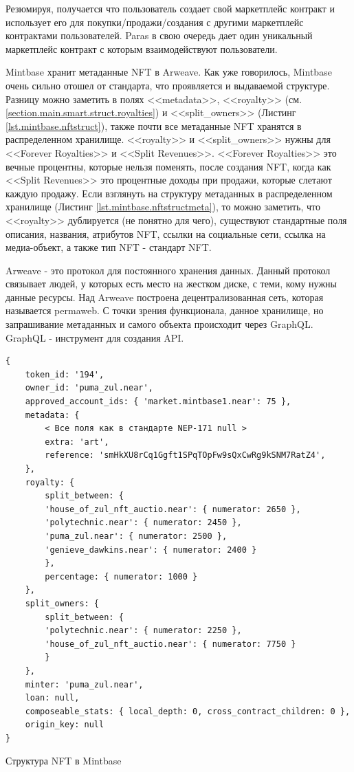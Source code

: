 Резюмируя, получается что пользователь создает свой маркетплейс контракт и использует его для покупки/продажи/создания с другими маркетплейс контрактами пользователей. Paras в свою очередь дает один уникальный маркетплейс контракт с которым взаимодействуют пользователи.

Mintbase хранит метаданные NFT в Arweave. Как уже говорилось, Mintbase очень сильно отошел от стандарта, что проявляется и выдаваемой структуре. Разницу можно заметить в полях <<metadata>>, <<royalty>> (см. {\color{blue} \ref{section.main.smart.struct.royalties}}) и <<split\_owners>> (Листинг {\color{blue} \ref{lst.mintbase.nftstruct}}), также почти все метаданные NFT хранятся в распределенном хранилище. <<royalty>> и <<split\_owners>> нужны для <<Forever Royalties>> и <<Split Revenues>>. <<Forever Royalties>> это вечные процентны, которые нельзя поменять, после создания NFT, когда как <<Split Revenues>> это процентные доходы при продажи, которые слетают каждую продажу. Если взглянуть на структуру метаданных в распределенном хранилище (Листинг {\color{blue} \ref{lst.mintbase.nftstructmeta}}), то можно заметить, что <<royalty>> дублируется (не понятно для чего), существуют стандартные поля описания, названия, атрибутов NFT, ссылки на социальные сети, ссылка на медиа-объект, а также тип NFT - стандарт NFT.

\begin{definition}
    Arweave\cite{arweave} - это протокол для постоянного хранения данных. Данный протокол связывает людей, у которых есть место на жестком диске, с теми, кому нужны данные ресурсы. Над Arweave построена децентрализованная сеть, которая называется permaweb\cite{permaweb}. С точки зрения функционала, данное хранилище, но запрашивание метаданных и самого объекта происходит через GraphQL\cite{graphql}. GraphQL - инструмент для создания API.
\end{definition}

\begin{listing}
\begin{verbatim}
{
    token_id: '194',
    owner_id: 'puma_zul.near',
    approved_account_ids: { 'market.mintbase1.near': 75 },
    metadata: {
        < Все поля как в стандарте NEP-171 null >
        extra: 'art',
        reference: 'smHkXU8rCq1Ggft1SPqTOpFw9sQxCwRg9kSNM7RatZ4',
    },
    royalty: {
        split_between: {
        'house_of_zul_nft_auctio.near': { numerator: 2650 },
        'polytechnic.near': { numerator: 2450 },
        'puma_zul.near': { numerator: 2500 },
        'genieve_dawkins.near': { numerator: 2400 }
        },
        percentage: { numerator: 1000 }
    },
    split_owners: {
        split_between: {
        'polytechnic.near': { numerator: 2250 },
        'house_of_zul_nft_auctio.near': { numerator: 7750 }
        }
    },
    minter: 'puma_zul.near',
    loan: null,
    composeable_stats: { local_depth: 0, cross_contract_children: 0 },
    origin_key: null
}

\end{verbatim}
\caption{Структура NFT в Mintbase}
\label{lst.mintbase.nftstruct}
\end{listing}

